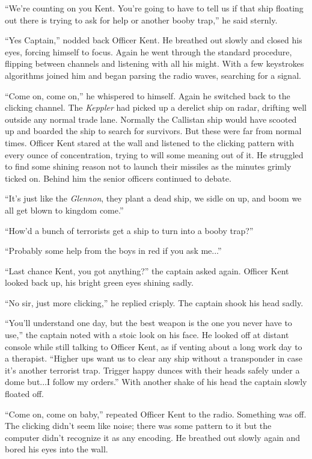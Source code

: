 \documentclass[12pt]{article} %
\begin{document}
``We're counting on you Kent. You're going to have to tell us if that ship floating out there is trying to ask for help or another booby trap,'' he said sternly.

``Yes Captain,'' nodded back Officer Kent. He breathed out slowly and closed his eyes, forcing himself to focus. Again he went through the standard procedure, flipping between channels and listening with all his might. With a few keystrokes algorithms joined him and began parsing the radio waves, searching for a signal.

``Come on, come on,'' he whispered to himself. Again he switched back to the clicking channel. The \textit{Keppler} had picked up a derelict ship on radar, drifting well outside any normal trade lane. Normally the Callistan ship would have scooted up and boarded the ship to search for survivors. But these were far from normal times. Officer Kent stared at the wall and listened to the clicking pattern with every ounce of concentration, trying to will some meaning out of it. He struggled to find some shining reason not to launch their missiles as the minutes grimly ticked on. Behind him the senior officers continued to debate.

``It's just like the \textit{Glennon}, they plant a dead ship, we sidle on up, and boom we all get blown to kingdom come.''

``How'd a bunch of terrorists get a ship to turn into a booby trap?''

``Probably some help from the boys in red if you ask me...''

``Last chance Kent, you got anything?'' the captain asked again. Officer Kent looked back up, his bright green eyes shining sadly.

``No sir, just more clicking,'' he replied crisply. The captain shook his head sadly.

``You'll understand one day, but the best weapon is the one you never have to use,'' the captain noted with a stoic look on his face. He looked off at distant console while still talking to Officer Kent, as if venting about a long work day to a therapist. ``Higher ups want us to clear any ship without a transponder in case it's another terrorist trap. Trigger happy dunces with their heads safely under a dome but...I follow my orders.'' With another shake of his head the captain slowly floated off.

``Come on, come on baby,'' repeated Officer Kent to the radio. Something was off. The clicking didn't seem like noise; there was some pattern to it but the computer didn't recognize it as any encoding. He breathed out slowly again and bored his eyes into the wall. 
\end{document}
